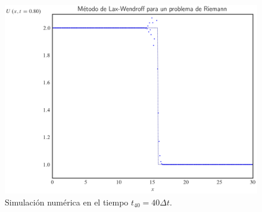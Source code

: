 \begin{figure}[ht!]
    \includegraphics[width=.3\paperwidth]{../snapshots/lax-wendroffheaviside1d-40.png}
    \caption{Simulación numérica en el tiempo $t_{40}=40\Delta t$.}
    \label{fig:example1t2}
\end{figure}